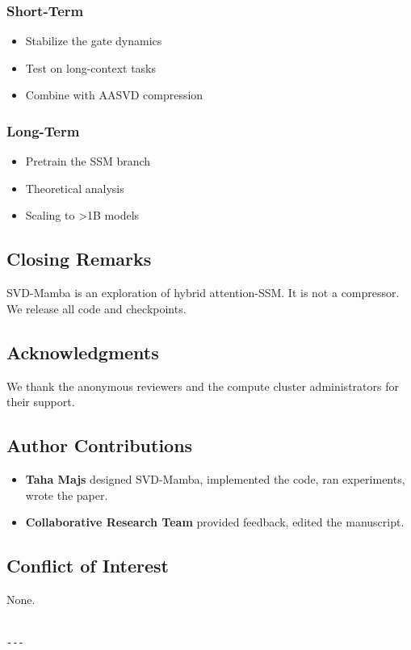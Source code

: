 \subsubsection{Short-Term}
\begin{itemize}
\item Stabilize the gate dynamics
\item Test on long-context tasks
\item Combine with AASVD compression

\end{itemize}
\subsubsection{Long-Term}
\begin{itemize}
\item Pretrain the SSM branch
\item Theoretical analysis
\item Scaling to >1B models

\end{itemize}
\subsection{Closing Remarks}

SVD-Mamba is an exploration of hybrid attention-SSM. It is not a 
compressor. We release all code and checkpoints.

\subsection{Acknowledgments}

We thank the anonymous reviewers and the compute cluster administrators for their support.

\subsection{Author Contributions}

\begin{itemize}
\item \textbf{Taha Majs} designed SVD-Mamba, implemented the code, ran
  experiments, wrote the paper.
\item \textbf{Collaborative Research Team} provided feedback, edited the manuscript.

\end{itemize}
\subsection{Conflict of Interest}

None.
\begin{lstlisting}

---
\end{lstlisting}